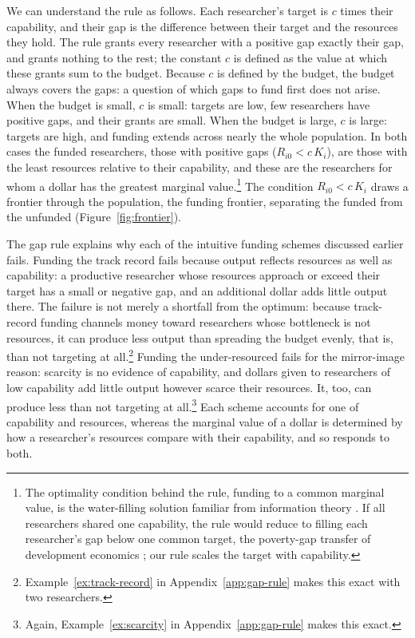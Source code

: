 \documentclass[article, 11pt, reqno]{amsart}
\theoremstyle{named}
\begin{document}
We can understand the rule as follows. Each researcher's target is $c$ times their
capability, and their gap is the difference between their target and the resources they
hold. The rule grants every researcher with a positive gap exactly their gap, and grants
nothing to the rest; the constant $c$ is defined as the value at which these grants sum to
the budget. Because $c$ is defined by the budget, the budget always covers the gaps: a
question of which gaps to fund first does not arise. When the budget is small, $c$ is
small: targets are low, few researchers have positive gaps, and their grants are small.
When the budget is large, $c$ is large: targets are high, and funding extends across
nearly the whole population. In both cases the funded researchers, those with positive
gaps ($R_{i0} < c\,K_i$), are those with the least resources relative to their capability,
and these are the researchers for whom a dollar has the greatest marginal
value.\footnote{The optimality condition behind the rule, funding to a common marginal
value, is the water-filling solution familiar from information theory
\citep{CoverThomas2006}. If all researchers shared one capability, the rule would reduce
to filling each researcher's gap below one common target, the poverty-gap transfer of
development economics \citep{FGT1984}; our rule scales the target with capability.} The
condition $R_{i0} < c\,K_i$ draws a frontier through the population, the funding frontier,
separating the funded from the unfunded (Figure~\ref{fig:frontier}).



The gap rule explains why each of the intuitive funding schemes discussed earlier fails.
Funding the track record fails because output reflects resources as well as capability: a
productive researcher whose resources approach or exceed their target has a small or
negative gap, and an additional dollar adds little output there. The failure is not merely a
shortfall from the optimum: because track-record funding channels money toward researchers
whose bottleneck is not resources, it can produce less output than spreading the budget
evenly, that is, than not targeting at all.\footnote{Example~\ref{ex:track-record} in Appendix~\ref{app:gap-rule} makes this exact with two researchers.} Funding the under-resourced fails for the mirror-image reason: scarcity is no
evidence of capability, and dollars given to researchers of low capability add little
output however scarce their resources. It, too, can produce less than not targeting at
all.\footnote{Again, Example~\ref{ex:scarcity} in Appendix~\ref{app:gap-rule} makes this exact.} Each scheme accounts for one of
capability and resources, whereas the marginal value of a dollar is determined by how a
researcher's resources compare with their capability, and so responds to both.
\end{document}
